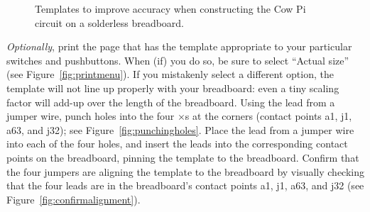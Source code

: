 \begin{figure}[p]
    \vspace{.5in}
    \caption{Templates to improve accuracy when constructing the Cow Pi circuit on a solderless breadboard.}\label{fig:templates}%
\end{figure}

\textit{Optionally}, print the page that has the template appropriate to your particular switches and pushbuttons.
When (if) you do so, be sure to select ``Actual size'' (see Figure~\ref{fig:printmenu}).
If you mistakenly select a different option, the template will not line up properly with your breadboard: even a tiny scaling factor will add-up over the length of the breadboard.
Using the lead from a jumper wire, punch holes into the four $\times$s at the corners (contact points a1, j1, a63, and j32); see Figure~\ref{fig:punchingholes}.
Place the lead from a jumper wire into each of the four holes, and insert the leads into the corresponding contact points on the breadboard, pinning the template to the breadboard.
Confirm that the four jumpers are aligning the template to the breadboard by visually checking that the four leads are in the breadboard's contact points a1, j1, a63, and j32 (see Figure~\ref{fig:confirmalignment}).

